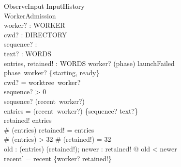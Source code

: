 \documentclass[a4paper,10pt,fleqn]{article}
\begin{document}
\begin{schema}{ObserveInput}
  \Delta InputHistory \\
  \Xi WorkerAdmission \\
  worker? : WORKER \\
  cwd? : DIRECTORY \\
  sequence? : \nat \\
  text? : WORDS \\
  entries, retained! : \nat \pfun WORDS
\where
  worker? \in (\dom phase) \setminus launchFailed \\
  phase~worker? \in \{starting, ready\} \\
  cwd? = worktree~worker? \\
  sequence? > 0 \\
  sequence? \notin \dom (recent~worker?) \\
  entries = (recent~worker?) \cup \{sequence? \mapsto text?\} \\
  retained! \subseteq entries \\
  \# (\dom entries)  \implies retained! = entries \\
  \# (\dom entries) > 32 \implies \# (\dom retained!) = 32 \\
  \forall old : (\dom entries) \setminus (\dom retained!); newer : \dom retained! @ old < newer \\
  recent' = recent \oplus \{worker? \mapsto retained!\}
\end{schema}
\end{document}
